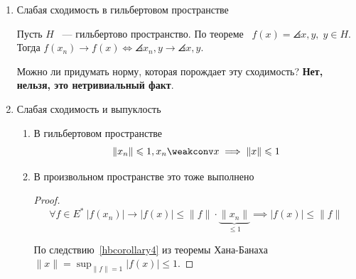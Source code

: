 \begin{enumerate}
\begin{itemize}
        \begin{counterexample} $H = l_2(\R), e^n = (0, \ldots, 0, 1, 0 \ldots)$. Понятно, что сходимости по норме нет. Однако, если рассмотреть определение и перейти к скалярному произведению:
        \[ \angles{e^n, y} = y_n \to 0 = \angles{0, y}.\]
        Причем \(y_n\) стремится к нулю как член сходящегося ряда. Откуда получаем, что $e^n \weakconv 0$.
        \end{counterexample}

        \begin{exercise}
            В $l_2$ секвенциально слабое замыкание $\overline{S(0, 1)} = \overline{B}(0, 1)$
        \end{exercise}
    \end{itemize}

    \item Слабая сходимость в гильбертовом пространстве

    Пусть $H$ ~--- гильбертово пространство. По теореме~ $f(x)=\angles{x, y},\; y \in H$. Тогда $f(x_n) \to f(x) \Leftrightarrow \angles{x_n, y} \to \angles{ x, y }$.

    Можно ли придумать норму, которая порождает эту сходимость? \textbf{Нет, нельзя, это нетривиальный факт}.

    \item Слабая сходимость и выпуклость

    \begin{exercise}
        \begin{enumerate}[label=\alph*)]
            \item В гильбертовом пространстве
            \[
            \|x_n\| \leqslant 1, x_n  \weakconv x \implies \|x\| \leqslant 1
            \]

            \item В произвольном пространстве это тоже выполнено
            
           \begin{proof}
            \[\forall f \in E^* \ |f(x_n)| \to |f(x)| \leqslant 
            \|f\| \cdot \underbrace{\|x_n\|}_{\leqslant 1} \implies |f(x)| \leqslant \|f\|\]

            По следствию~\ref{hbcorollary4} из теоремы Хана-Банаха 
            $\|x\| = \sup_{\|f\| = 1} |f(x)| \leqslant 1$.
            \end{proof}
        \end{enumerate}
        
    \end{exercise}


\end{enumerate}
